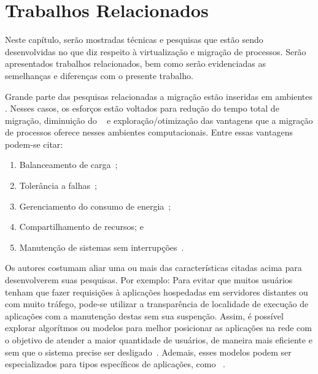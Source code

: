 \glsresetall
\chapter{Trabalhos Relacionados}
\label{chap.related-work}

Neste capítulo, serão mostradas técnicas e pesquisas que estão sendo desenvolvidas no que diz respeito à virtualização e migração de processos. Serão apresentados trabalhos relacionados, bem como serão evidenciadas as semelhanças e diferenças com o presente trabalho.

Grande parte das pesquisas relacionadas a migração estão inseridas em ambientes \cloud. Nesses casos, os esforços estão voltados para redução do tempo total de migração, diminuição do \downtime~\cite{migration-linux-conteiners,clark2005live} e exploração/otimização das vantagens que a migração de processos oferece nesses ambientes computacionais. Entre essas vantagens podem-se citar:
\begin{enumerate}[label=(\roman*)]
    \item Balanceamento de carga~\cite{live-vm-migration-techniques,ada-things};
    \item Tolerância a falhas~\cite{fernando2019live};
    \item Gerenciamento do consumo de energia~\cite{aldossary2018performance};
    \item Compartilhamento de recursos; e
    \item Manutenção de sistemas sem interrupções~\cite{live-vm-migration-techniques,ada-things}.
\end{enumerate}


Os autores costumam aliar uma ou mais das características citadas acima para desenvolverem suas pesquisas. Por exemplo:
    Para evitar que muitos usuários tenham que fazer requisições à aplicações hospedadas em servidores distantes ou com muito tráfego, pode-se utilizar a transparência de localidade de execução de aplicações com a manutenção destas sem sua suspenção. Assim, é possível explorar algorítmos ou modelos para melhor posicionar as aplicações na rede com o objetivo de atender a maior quantidade de usuários, de maneira mais eficiente e sem que o sistema precise ser desligado~\cite{live-migration-sdn}. Ademais, esses modelos podem ser especializados para tipos específicos de aplicações, como \iot~\cite{ada-things}.

